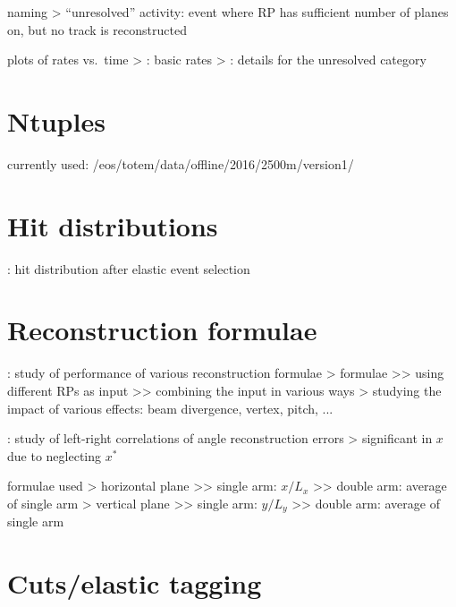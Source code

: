 \> naming
\>> ``unresolved'' activity: event where RP has sufficient number of planes on, but no track is reconstructed

\> plots of rates vs.~time
\>> : basic rates
\>> : details for the unresolved category


\section{Ntuples}

\> currently used: /eos/totem/data/offline/2016/2500m/version1/

\section{Hit distributions}

\> : hit distribution after elastic event selection

\section{Reconstruction formulae}

\>  : study of performance of various reconstruction formulae
\>> formulae
\>>> using different RPs as input
\>>> combining the input in various ways
\>> studying the impact of various effects: beam divergence, vertex, pitch, ...

\>  : study of left-right correlations of angle reconstruction errors
\>> significant in $x$ due to neglecting $x^*$

\> formulae used
\>> horizontal plane
\>>> single arm: $x / L_x$
\>>> double arm: average of single arm
\>> vertical plane
\>>> single arm: $y / L_y$
\>>> double arm: average of single arm

\section{Cuts/elastic tagging}

